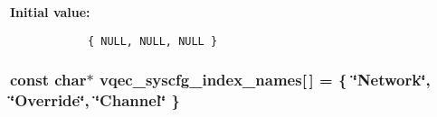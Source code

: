 \textbf{Initial value:}

\begin{Code}\begin{verbatim} 
            { NULL, NULL, NULL }
\end{verbatim}\end{Code}
\subsubsection{\setlength{\rightskip}{0pt plus 5cm}const char$\ast$ \bf{vqec\_\-syscfg\_\-index\_\-names}[$\,$] = \{ \char`\"{}Network\char`\"{}, \char`\"{}Override\char`\"{}, \char`\"{}Channel\char`\"{} \}}\label{vqec__syscfg_8c_c02123a006a65e80d7f678fe382f126c}


